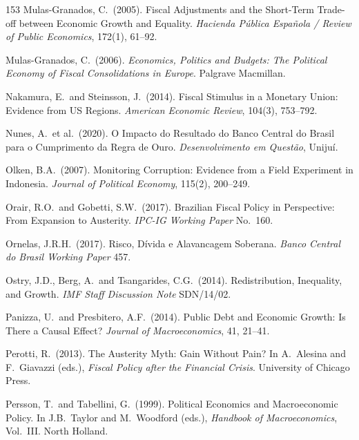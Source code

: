 \documentclass[11pt,a4paper]{article}
\begin{document}
\begin{thebibliography}{153}
 Mulas-Granados, C.\ (2005). Fiscal Adjustments and the Short-Term Trade-off between Economic Growth and Equality. \textit{Hacienda P\'ublica Espa\~nola / Review of Public Economics}, 172(1), 61--92.

 Mulas-Granados, C.\ (2006). \textit{Economics, Politics and Budgets: The Political Economy of Fiscal Consolidations in Europe}. Palgrave Macmillan.

 Nakamura, E.\ and Steinsson, J.\ (2014). Fiscal Stimulus in a Monetary Union: Evidence from US Regions. \textit{American Economic Review}, 104(3), 753--792.

 Nunes, A.\ et al.\ (2020). O Impacto do Resultado do Banco Central do Brasil para o Cumprimento da Regra de Ouro. \textit{Desenvolvimento em Quest\~ao}, Unijuí.

 Olken, B.A.\ (2007). Monitoring Corruption: Evidence from a Field Experiment in Indonesia. \textit{Journal of Political Economy}, 115(2), 200--249.

 Orair, R.O.\ and Gobetti, S.W.\ (2017). Brazilian Fiscal Policy in Perspective: From Expansion to Austerity. \textit{IPC-IG Working Paper} No.\ 160.

 Ornelas, J.R.H.\ (2017). Risco, D\'ivida e Alavancagem Soberana. \textit{Banco Central do Brasil Working Paper} 457.

 Ostry, J.D., Berg, A.\ and Tsangarides, C.G.\ (2014). Redistribution, Inequality, and Growth. \textit{IMF Staff Discussion Note} SDN/14/02.

 Panizza, U.\ and Presbitero, A.F.\ (2014). Public Debt and Economic Growth: Is There a Causal Effect? \textit{Journal of Macroeconomics}, 41, 21--41.

 Perotti, R.\ (2013). The Austerity Myth: Gain Without Pain? In A.\ Alesina and F.\ Giavazzi (eds.), \textit{Fiscal Policy after the Financial Crisis}. University of Chicago Press.

 Persson, T.\ and Tabellini, G.\ (1999). Political Economics and Macroeconomic Policy. In J.B.\ Taylor and M.\ Woodford (eds.), \textit{Handbook of Macroeconomics}, Vol.\ III. North Holland.


\end{thebibliography}
\end{document}
